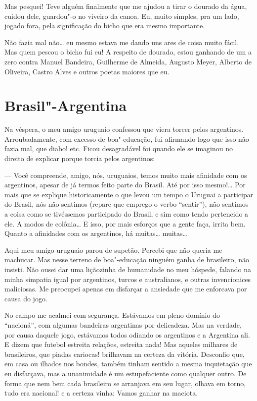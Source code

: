 Mas pesquei! Teve alguém finalmente que me ajudou a tirar o dourado da
água, cuidou dele, guardou"-o no viveiro da canoa. Eu, muito simples, pra
um lado, jogado fora, pela significação do bicho que era mesmo
importante.

Não fazia mal não\ldots{} eu mesmo estava me dando uns ares de coisa muito
fácil. Mas quem pescou o bicho fui eu! A respeito de dourado, estou
ganhando de um a zero contra Manuel Bandeira, Guilherme de Almeida,
Augusto Meyer, Alberto de Oliveira, Castro Alves e outros poetas maiores
que eu.

\chapter{Brasil"-Argentina}

Na véspera, o meu amigo uruguaio confessou que viera torcer pelos
argentinos. Arroubadamente, com excesso de boa"-educação, fui afirmando
logo que isso não fazia mal, que diabo! etc. Ficou desagradável foi
quando ele se imaginou no direito de explicar porque torcia pelos
argentinos:

--- Você compreende, amigo, nós, uruguaios, temos muito mais afinidade
com os argentinos, apesar de já termos feito parte do Brasil. Até por
isso mesmo!\ldots{} Por mais que se explique historicamente o que levou um
tempo o Uruguai a participar do Brasil, nós não sentimos (repare que
emprego o verbo ``sentir''), não sentimos a coisa como se tivéssemos
participado do Brasil, e sim como tendo pertencido a ele. A modos de
colônia\ldots{} E isso, por mais esforços que a gente faça, irrita bem.
Quanto a afinidades com os argentinos, há muitas\ldots{} muitas\ldots{}

Aqui meu amigo uruguaio parou de supetão. Percebi que não queria me
machucar. Mas nesse terreno de boa"-educação ninguém ganha de brasileiro,
não insisti. Não ousei dar uma liçãozinha de humanidade no meu hóspede,
falando na minha simpatia igual por argentinos, turcos e australianos, e
outras invencionices maliciosas. Me preocupei apenas em disfarçar a
ansiedade que me enforcava por causa do jogo.

No campo me acalmei com segurança. Estávamos em pleno domínio do
``nacioná'', com algumas bandeiras argentinas por delicadeza. Mas na
verdade, por causa daquele jogo, estávamos todos odiando os argentinos e
a Argentina ali. E dizem que futebol estreita relações, estreita nada!
Mas aqueles milhares de brasileiros, que piadas cariocas! brilhavam na
certeza da vitória. Desconfio que, em casa ou ilhados nos bondes, também
tinham sentido a mesma inquietação que eu disfarçava, mas a unanimidade
é um estupefaciente como qualquer outro. De forma que nem bem cada
brasileiro se arranjava em seu lugar, olhava em torno, tudo era
nacional! e a certeza vinha: Vamos ganhar na maciota.

